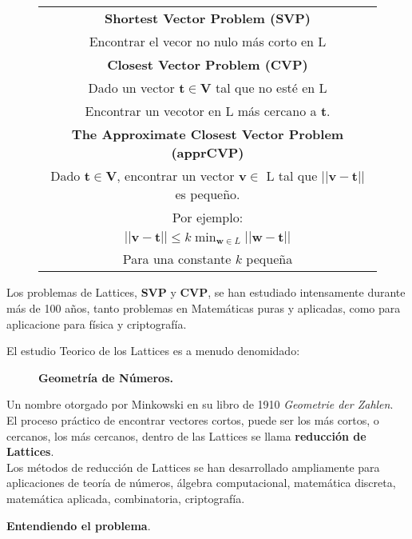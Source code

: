 \documentclass[11pt]{article}
\begin{document}
\begin{abstact}
\begin{figure}[h]
\centering
\begin{tabular}{|| c ||}
\hline
\hline
	\textbf{Shortest Vector Problem (SVP)}\\ 
	Encontrar el vecor no nulo más corto en L \\
\hline
\hline
\textbf{Closest Vector Problem (CVP)}  \\
Dado un vector $\mathbf{t} \in$\textbf{V} tal que no esté en L\\
Encontrar un vecotor en L más cercano a $\mathbf{t}$. \\ 
\hline
\textbf{The Approximate Closest Vector Problem (apprCVP)}\\ 
Dado $\mathbf{t}\in$\textbf{V}, encontrar un vector $\mathbf{v} \in$ L tal que $||\mathbf{v}-\mathbf{t}||$ es pequeño.\\
Por ejemplo: \\ 
	$||\mathbf{v}-\mathbf{t}||\leq k \displaystyle\min_{\mathbf{w} \in L}||\mathbf{w}-\mathbf{t}|| $ \\ 
Para una constante $k$ pequeña \\
\hline
\hline
\end{tabular}
\end{figure}

Los problemas de Lattices, \textbf{SVP} y \textbf{CVP}, se han estudiado intensamente durante más de 100 años, tanto problemas en Matemáticas puras y aplicadas, como para aplicacione para física y criptografía.

El estudio Teorico de los Lattices es a menudo denomidado:
\begin{figure}[h]
	\centering
	\textbf{Geometría de Números.}
\end{figure}

Un nombre otorgado por Minkowski en su libro de 1910 \textit{Geometrie der Zahlen}.\\

El proceso práctico de encontrar vectores cortos, puede ser los más cortos, o cercanos, los más cercanos, dentro de las Lattices se llama \textbf{reducción de Lattices}.\\

Los métodos de reducción de Lattices se han desarrollado ampliamente para aplicaciones de teoría de números, álgebra computacional, matemática discreta, matemática aplicada, combinatoria, criptografía.\\

\pagebreak

\textbf{Entendiendo el problema}. \\


\end{abstact}
\end{document}
